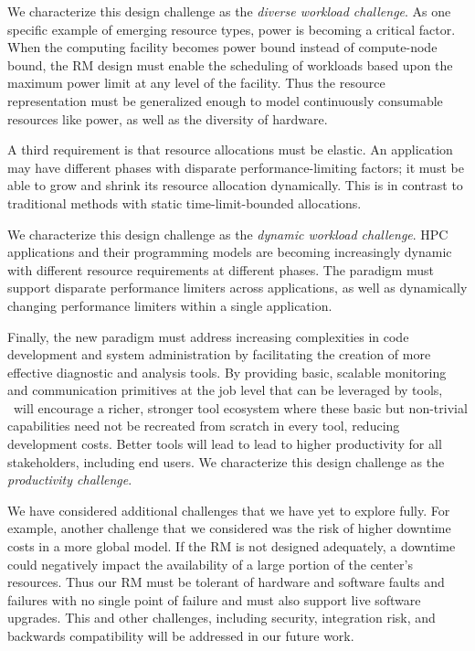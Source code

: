 We characterize this design challenge as the {\em diverse workload
challenge}.   As one specific example of emerging resource types,
power is becoming a critical factor. When the computing facility
becomes power bound instead of compute-node bound, the RM design
must enable the scheduling of workloads based upon the maximum
power limit at any level of the facility. Thus the resource
representation must be generalized enough to model continuously consumable
resources like power, as well as the diversity of hardware.

A third requirement is that resource allocations
must be elastic. An application may have different
phases with disparate performance-limiting factors;
it must be able to grow and shrink its resource allocation
dynamically.  This is in contrast to traditional methods with
static time-limit-bounded allocations.

We characterize this design challenge as the {\em dynamic workload
challenge}.  HPC applications and their programming models are
becoming increasingly dynamic with different resource requirements
at different phases.  The paradigm must support disparate performance
limiters across applications, as well as dynamically changing performance
limiters within a single application.

Finally, the new paradigm must address increasing complexities
in code development and system administration by facilitating
the creation of more effective diagnostic and analysis tools.
By providing basic, scalable monitoring and communication
primitives at the job level that can be leveraged by tools,
\flux\ will encourage a richer, stronger tool ecosystem where
these basic but non-trivial capabilities need not be recreated
from scratch in every tool, reducing development costs.
Better tools will lead to lead to higher productivity for all
stakeholders, including end users.
We characterize this design challenge as the {\em productivity challenge}.

We have considered additional challenges that we
have yet to explore fully. For example,
another challenge that we considered was 
the risk of higher downtime costs in a more global model.
If the RM is not designed adequately, a downtime could negatively
impact the availability of a large portion of the center's
resources. Thus our RM must be tolerant of hardware and software
faults and failures with no single point of failure and must
also support live software upgrades. This and other challenges,
including security, integration risk, and backwards compatibility 
will be addressed in our future work.

%
